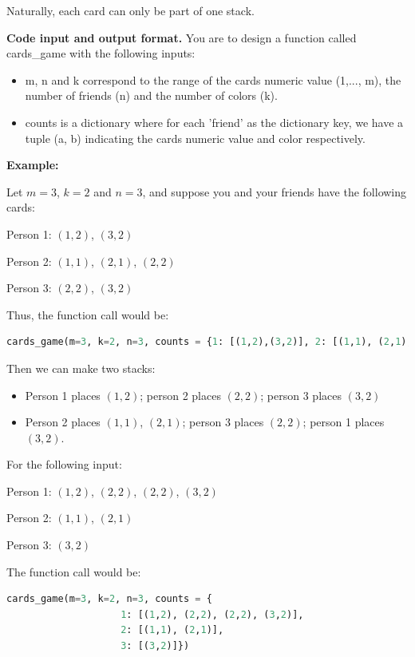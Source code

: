 \documentclass{hw}
\newcommand{\io}{\textbf{Code input and output format.} }
\begin{document}
\begin{challenge}
Naturally, each card can only be part of one stack.

\io You are to design a function called cards\_game with the following inputs:
\begin{itemize}
    \item m, n and k correspond to the range of the cards numeric value (1,..., m), the number of friends (n) and the number of colors (k).
    \item counts is a dictionary where for each 'friend' as the dictionary key, we have a tuple (a, b) indicating the cards numeric value and color respectively.
\end{itemize}

\textbf{Example:}

Let \(m = 3\), \(k = 2\) and \(n = 3\), and suppose you and your friends have the following cards:

Person 1: \((1,2)\), \((3,2)\)

Person 2: \((1,1)\), \((2,1)\), \((2,2)\)

Person 3: \((2,2)\), \((3,2)\)

Thus, the function call would be: 

\begin{lstlisting}[language=Python,caption={The python function call to be made to generate the graphs for Problems 2.a,b,c.},captionpos=b]
cards_game(m=3, k=2, n=3, counts = {1: [(1,2),(3,2)], 2: [(1,1), (2,1), (2,2)], 3: [(2,2), (3,2)]})
\end{lstlisting}

Then we can make two stacks:
\begin{itemize}
    \item Person 1 places \((1,2)\); person 2 places \((2,2)\); person 3 places \((3,2)\)
    \item Person 2 places \((1,1)\), \((2,1)\); person 3 places \((2,2)\); person 1 places \((3,2)\).
\end{itemize}

For the following input:

Person 1: \((1,2)\), \((2,2)\), \((2,2)\), \((3,2)\)

Person 2: \((1,1)\), \((2,1)\)

Person 3: \((3,2)\)


The function call would be: 

\begin{lstlisting}[language=Python,caption={The python function call to be made to generate the graphs for Problems 2.a,b,c.},captionpos=b]
cards_game(m=3, k=2, n=3, counts = {
                    1: [(1,2), (2,2), (2,2), (3,2)],
                    2: [(1,1), (2,1)],
                    3: [(3,2)]})
\end{lstlisting}


\end{challenge}
\end{document}
